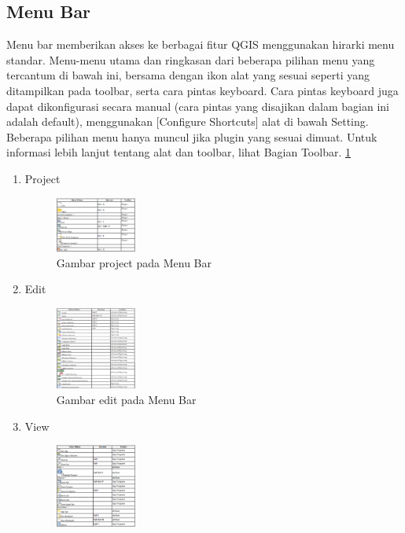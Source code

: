 \subsection{Menu Bar}
Menu bar memberikan akses ke berbagai fitur QGIS menggunakan hirarki menu standar. Menu-menu utama dan ringkasan dari beberapa pilihan menu yang tercantum di bawah ini, bersama dengan ikon alat yang sesuai seperti yang ditampilkan pada toolbar, serta cara pintas keyboard. Cara pintas keyboard juga dapat dikonfigurasi secara manual (cara pintas yang disajikan dalam bagian ini adalah default), menggunakan [Configure Shortcuts] alat di bawah Setting. Beberapa pilihan menu hanya muncul jika plugin yang sesuai dimuat. Untuk informasi lebih lanjut tentang alat dan toolbar, lihat Bagian Toolbar. \ref{menubar}
\begin{enumerate}
\item
Project
\begin{figure}[ht]
    \centerline{\includegraphics[width=0.25\textwidth]{figures/menubar.png}}
    \caption{Gambar project pada Menu Bar}
    \label{menubar}
    \end{figure}
\item
Edit
\begin{figure}[ht]
    \centerline{\includegraphics[width=0.25\textwidth]{figures/menubar1.png}}
    \caption{Gambar edit pada Menu Bar}
    \label{menubar1}
    \end{figure}
\item
View
\begin{figure}[ht]
    \centerline{\includegraphics[width=0.25\textwidth]{figures/menubar2.png}}

\end{figure}
\end{enumerate}
